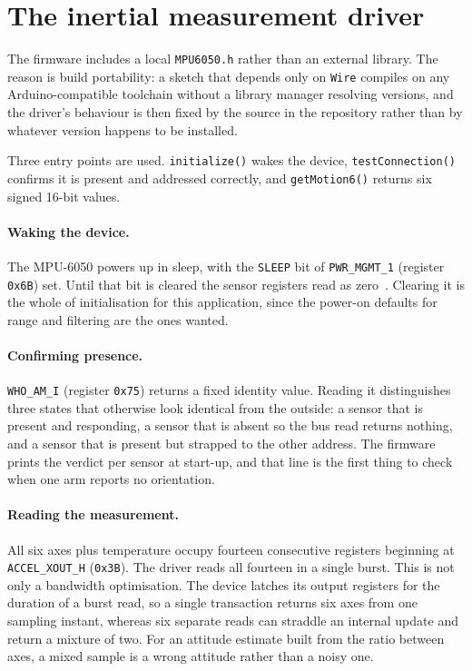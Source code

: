 \section{The inertial measurement driver}

The firmware includes a local \texttt{MPU6050.h} rather than an external
library. The reason is build portability: a sketch that depends only on
\texttt{Wire} compiles on any Arduino-compatible toolchain without a library
manager resolving versions, and the driver's behaviour is then fixed by the
source in the repository rather than by whatever version happens to be
installed.


Three entry points are used. \texttt{initialize()} wakes the device,
\texttt{testConnection()} confirms it is present and addressed correctly, and
\texttt{getMotion6()} returns six signed 16-bit values.

\paragraph{Waking the device.} The MPU-6050 powers up in sleep, with the
\texttt{SLEEP} bit of \texttt{PWR\_MGMT\_1} (register \texttt{0x6B}) set.
Until that bit is cleared the sensor registers read as
zero~\cite{invensense2013mpuregmap}. Clearing it is the whole of
initialisation for this application, since the power-on defaults for range and
filtering are the ones wanted.

\paragraph{Confirming presence.} \texttt{WHO\_AM\_I} (register \texttt{0x75})
returns a fixed identity value. Reading it distinguishes three states that
otherwise look identical from the outside: a sensor that is present and
responding, a sensor that is absent so the bus read returns nothing, and a
sensor that is present but strapped to the other address. The firmware prints
the verdict per sensor at start-up, and that line is the first thing to check
when one arm reports no orientation.

\paragraph{Reading the measurement.} All six axes plus temperature occupy
fourteen consecutive registers beginning at \texttt{ACCEL\_XOUT\_H}
(\texttt{0x3B}). The driver reads all fourteen in a single burst. This is not
only a bandwidth optimisation. The device latches its output registers for the
duration of a burst read, so a single transaction returns six axes from one
sampling instant, whereas six separate reads can straddle an internal update
and return a mixture of two. For an attitude estimate built from the ratio
between axes, a mixed sample is a wrong attitude rather than a noisy one.

